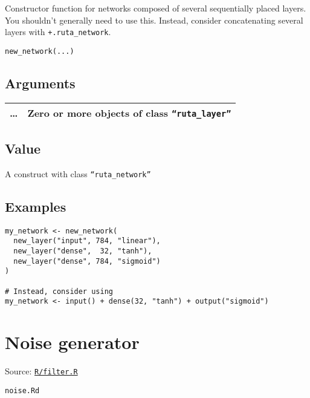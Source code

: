 Constructor function for networks composed of several sequentially
placed layers. You shouldn't generally need to use this. Instead,
consider concatenating several layers with \texttt{+.ruta\_network}.

\begin{verbatim}
new_network(...)
\end{verbatim}

\hypertarget{arguments}{\subsection{\texorpdfstring{\protect\hyperlink{arguments}{}Arguments}{Arguments}}\label{arguments}}

\begin{longtable}[c]{@{}>{\small}p{3cm}>{\raggedright}p{12.5cm}@{}}
\toprule
\ldots{} & Zero or more objects of class
\texttt{``ruta\_layer''}\tabularnewline
\bottomrule
\end{longtable}

\hypertarget{value}{\subsection{\texorpdfstring{\protect\hyperlink{value}{}Value}{Value}}\label{value}}

A construct with class \texttt{``ruta\_network''}

\hypertarget{examples}{\subsection{\texorpdfstring{\protect\hyperlink{examples}{}Examples}{Examples}}\label{examples}}

\begin{verbatim}
my_network <- new_network(
  new_layer("input", 784, "linear"),
  new_layer("dense",  32, "tanh"),
  new_layer("dense", 784, "sigmoid")
)

# Instead, consider using
my_network <- input() + dense(32, "tanh") + output("sigmoid")
\end{verbatim}

\section{Noise generator}\label{noise-generator}

Source:
\href{https://github.com/fdavidcl/ruta/blob/master/R/filter.R}{\texttt{R/filter.R}}

\texttt{noise.Rd}

